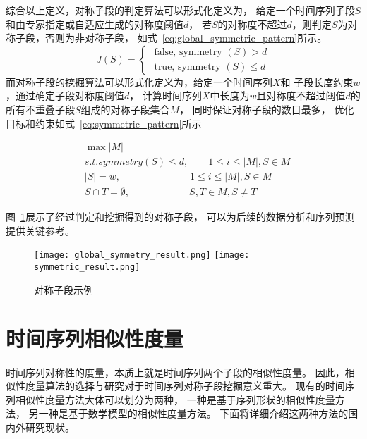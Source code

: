 综合以上定义，对称子段的判定算法可以形式化定义为，
给定一个时间序列子段$S$和由专家指定或自适应生成的对称度阈值$d$，
若$S$的对称度不超过$d$，则判定$S$为对称子段，否则为非对称子段，
如式~\ref{eq:global_symmetric_pattern}所示。
\begin{equation}
  J(S)=\left\{\begin{array}{l}
    \text { false, symmetry }(S)>d \\
    \text { true, symmetry }(S) \leq d
    \end{array}\right.
  \label{eq:global_symmetric_pattern}
\end{equation}
而对称子段的挖掘算法可以形式化定义为，给定一个时间序列$X$和
子段长度约束$w$，通过确定子段对称度阈值$d$，
计算时间序列$X$中长度为$w$且对称度不超过阈值$d$的
所有不重叠子段$S$组成的对称子段集合$M$，
同时保证对称子段的数目最多，
优化目标和约束如式~\ref{eq:symmetric_pattern}所示

\begin{equation}
  \begin{split}
    & \max \left| M \right| \\
    & s.t. symmetry \left( S \right) \leq d, \qquad 1 \leq i \leq \left| M \right|,S \in M \\
    & \left| S \right| = w, \qquad \qquad \qquad \quad 1 \leq i \leq \left| M \right|,S \in M \\
    & S \cap T = \emptyset, \qquad \qquad \qquad S,T \in M,S \neq T
  \end{split}
  \label{eq:symmetric_pattern}
\end{equation}

图~\ref{fig:symmetric_result}展示了经过判定和挖掘得到的对称子段，
可以为后续的数据分析和序列预测提供关键参考。
\begin{figure}
  \centering
    {\texttt{[image: global\_symmetry\_result.png]}}
    {\texttt{[image: symmetric\_result.png]}}
  \caption{对称子段示例}
  \label{fig:symmetric_result}
\end{figure}

\section{时间序列相似性度量}
时间序列对称性的度量，本质上就是时间序列两个子段的相似性度量。
因此，相似性度量算法的选择与研究对于时间序列对称子段挖掘意义重大。
现有的时间序列相似性度量方法大体可以划分为两种\cite{DBLP:journals/vldb/SuLZZZ20}，
一种是基于序列形状的相似性度量方法，
另一种是基于数学模型的相似性度量方法。
下面将详细介绍这两种方法的国内外研究现状。

